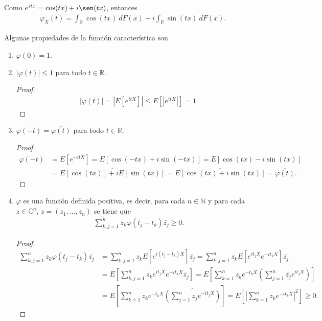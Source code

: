 \begin{obs}
    Como $e^{itx} = \cos(tx) + i \sen(tx)$, entonces
    \begin{align*}
        \varphi_X(t) = \int_{\mathbb{R}} \cos(tx) \ dF(x) + i \int_{\mathbb{R}} \sin(tx) \ dF(x).
    \end{align*}
\end{obs}
\noindent Algunas propiedades de la función característica son
\begin{enumerate}
    \item $\varphi(0) = 1$.
    \item $|\varphi(t)| \leq 1$ para todo $t \in \mathbb{R}$.
    \begin{proof}
        \begin{align*}
            |\varphi(t)| = \left|E \left[ e^{itX} \right] \right| \leq E \left[ \left| e^{itX} \right| \right] = 1.
        \end{align*}
    \end{proof}
    \item $\varphi(-t) = \overline{\varphi(t)}$ para todo $t \in \mathbb{R}$.
    \begin{proof}
        \begin{align*}
            \varphi(-t) &= E \left[ e^{-itX} \right] = E[\cos(-tx) + i\sin(-tx)] = E[\cos(tx) - i\sin(tx)] \\
            &= \overline{E[\cos(tx)] + iE[\sin(tx)]} = \overline{E[\cos(tx) + i\sin(tx)]} = \overline{\varphi(t)}.
        \end{align*}
    \end{proof}
    \item $\varphi$ es una función definida positiva, es decir, para cada $n \in \mathbb{N}$ y para cada $z \in \mathbb{C}^n$, $z = (z_1,...,z_n)$ se tiene que
    \begin{align*}
        \sum_{k,j=1}^{n} z_k \varphi(t_j-t_k)\overline{z_j} \ge 0.
    \end{align*}
    \begin{proof}
        \begin{align*}
            \sum_{k,j=1}^{n} z_k \varphi(t_j-t_k)\overline{z_j} &=\sum_{k,j=1}^{n} z_k E\left[ e^{i(t_j-t_k)X} \right]\overline{z_j} = \sum_{k,j=1}^{n} z_k E\left[ e^{it_jX}e^{-it_kX} \right]\overline{z_j} \\
            &= E \left[ \sum_{k,j=1}^{n} z_k e^{it_jX}e^{-it_kX} \overline{z_j} \right] = E \left[ \sum_{k=1}^{n} z_k e^{-t_kX} \left( \sum_{j=1}^{n} \overline{z_j} e^{it_jX} \right)\right] \\
            &= E \left[ \sum_{k=1}^{n} z_k e^{-t_kX} \overline{ \left( \sum_{j=1}^{n} z_j e^{-it_jX} \right)}\right] = E \left[ \left| \sum_{k=1}^{n} z_k e^{-it_kX} \right|^2 \right] \ge 0.
        \end{align*}
    \end{proof}
\end{enumerate}

